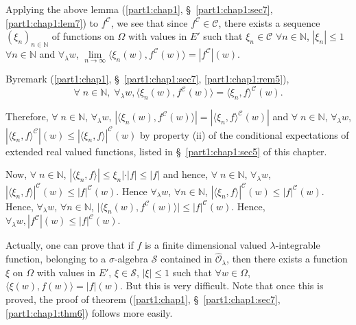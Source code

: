 \medskip
{}
Applying the above lemma (\ref{part1:chap1},
\S\ \ref{part1:chap1:sec7}, \ref{part1:chap1:lem7}) to $f^\mathscr{C}$, we see that
since $f^\mathscr{C} \in \mathscr{C}$, there exists a sequence
$(\xi_n)_{n \in \mathbb{N}}$ of functions on $\Omega$ with values in
$E'$ such that $\xi_n \in \mathscr{C} $ $\forall n \in \mathbb{N}$,
$|\xi_n | \leq 1$ $\forall n \in \mathbb{N}$ and $\forall_\lambda w$,
$\lim\limits_{n \to \infty} \langle \xi_n (w), f^\mathscr{C}
(w)\rangle = |f^\mathscr{C}|(w)$. 


By\pageoriginale remark (\ref{part1:chap1},
\S\ \ref{part1:chap1:sec7}, \ref{part1:chap1:rem5}),  
$$
\forall \; n \in \mathbb{N}, \; \forall_\lambda w, \langle \xi_n (w),
f^\mathscr{C} (w)\rangle = \langle \xi_n, f\rangle^\mathscr{C} (w). 
$$

Therefore, $\forall \; n \in\mathbb{N}$, $\forall_\lambda w$,
$|\langle \xi_n (w) , f^\mathscr{C} (w)\rangle | = | \langle \xi_n ,
f\rangle^\mathscr{C} (w)| $  and $\forall\; n \in \mathbb{N}$,
$\forall_\lambda w$, $|\langle \xi_n, f\rangle^\mathscr{C}| (w) \leq
|\langle \xi_n , f\rangle |^\mathscr{C} (w)$ by property (ii) of the
conditional expectations of extended real valued functions, listed in
\S\ \ref{part1:chap1:sec5} of this chapter. 

Now, $\forall \; n \in  \mathbb{N}$, $| \langle \xi_n, f \rangle | \leq
\xi_n | \cdot |f| \leq |f|$ and hence, $\forall \; n \in \mathbb{N}$,
$\forall_\lambda w$, $|\langle \xi_n, f\rangle |^\mathscr{C}(w) \leq
|f|^\mathscr{C}(w)$. Hence $\forall_\lambda w$, $\forall n \in
\mathbb{N}$, $| \langle \xi_n, f\rangle |^\mathscr{C} (w) \leq
|f|^\mathscr{C} (w)$. Hence, $\forall_\lambda w$, $\forall n \in
\mathbb{N}$, $\Big| \langle \xi_n (w), f^\mathscr{C} (w) \rangle
\Big| \leq |f|^\mathscr{C} (w)$. Hence, $\forall_\lambda w,
|f^\mathscr{C}|(w) \leq|f|^\mathscr{C} (w)$. 

\begin{rem}\label{part1:chap1:rem8}
Actually, one can prove that if $f$ is a finite dimensional valued
$\lambda$-integrable function, belonging to a $\sigma$-algebra
$\mathcal{S}$ contained in $\hat{\mathscr{O}}_\lambda$, then there
exists a function $\xi$ on $\Omega$ with values in $E'$, $\xi \in
\mathcal{S}$, $|\xi | \leq 1$ such that $\forall w \in\Omega$,
$\langle \xi(w), f(w)\rangle = |f|(w)$. But this is very
difficult. Note that once this is proved, the proof of theorem (\ref{part1:chap1},
\S\ \ref{part1:chap1:sec7}, \ref{part1:chap1:thm6}) follows more easily. 
\end{rem}

